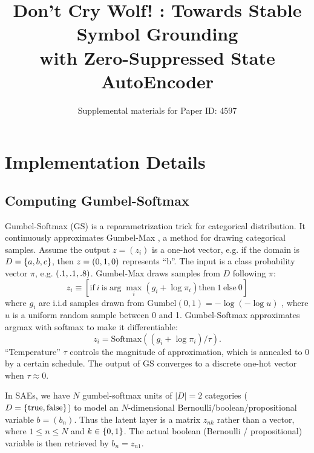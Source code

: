 \documentclass[10pt,letterpaper]{article}
\author{Supplemental materials for Paper ID: 4597}
\title{Don't Cry Wolf! : Towards Stable Symbol Grounding\\ with Zero-Suppressed State AutoEncoder}
\begin{document}
\maketitle

\section{Implementation Details}

\subsection{Computing Gumbel-Softmax}
\label{gumbel-softmax-implementation}


Gumbel-Softmax (GS) is a reparametrization trick \cite{jang2016categorical} for categorical distribution.
It continuously approximates Gumbel-Max \cite{maddison2014sampling}, a method for drawing categorical samples.
Assume the output $z=(z_i)$ is a one-hot vector, e.g. if the domain is $D={\left\{a,b,c\right\}}$, then $z={\left(0,1,0\right)}$ represents ``b''.
The input is a class probability vector $\pi$, e.g. ${\left(.1,.1,.8\right)}$.
Gumbel-Max draws samples from $D$ following $\pi$:
\[
z_i \equiv [ \text{if}\ i\ \text{is} \arg \max_i (g_i+\log \pi_i) \text{then}\ 1\ \text{else}\ 0 ]
\]
where $g_i$ are i.i.d samples drawn from
 $\text{Gumbel}(0,1) =-\log (-\log u)$ \cite{gumbel1954statistical}, where
$u$ is a uniform random sample between 0 and 1.
Gumbel-Softmax approximates argmax with softmax to make it differentiable:
\[
z_i = \text{Softmax}((g_i+\log \pi_i)/\tau).
\]
``Temperature'' $\tau$ controls the magnitude of approximation, which is annealed to 0 by a certain schedule.
The output of GS converges to a discrete one-hot vector when $\tau\approx 0$.

In SAEs, we have $N$ gumbel-softmax units of $|D|=2$ categories ($D={\left\{\text{true},\text{false}\right\}}$)
to model an $N$-dimensional Bernoulli/boolean/propositional variable $b=(b_n)$.
Thus the latent layer is a matrix $z_{nk}$ rather than a vector, where $1\leq n \leq N$ and $k\in{\left\{0,1\right\}}$.
The actual boolean (Bernoulli / propositional) variable is then retrieved by $b_n=z_{n1}$.
\end{document}

